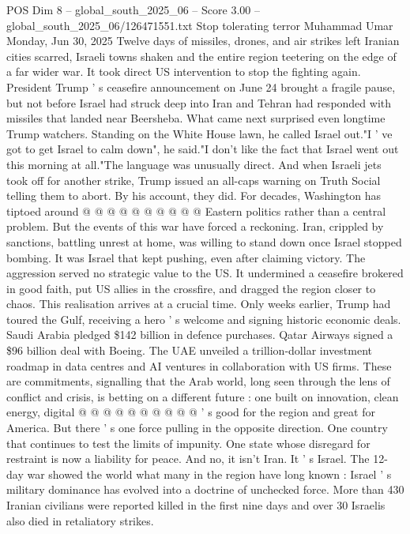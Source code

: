 \begin{textsample}{POS Dim 8 – global\_south\_2025\_06 – Score 3.00 – global\_south\_2025\_06/126471551.txt}  \label{ex:f8_pos_197}
Stop tolerating terror Muhammad Umar Monday, Jun 30, 2025 Twelve days of missiles, drones, and air strikes left Iranian cities scarred, Israeli towns shaken and the entire region teetering on the edge of a far wider war.
It took direct US intervention to stop the fighting again.
President Trump ' s ceasefire announcement on June 24 brought a fragile pause, but not before Israel had struck deep into Iran and Tehran had responded with missiles that landed near Beersheba.
What came next surprised even longtime Trump watchers.
Standing on the White House lawn, he called Israel out."I ' ve got to get Israel to calm down", he said."I don't like the fact that Israel went out this morning at all."The language was unusually direct.
And when Israeli jets took off for another strike, Trump issued an all-caps warning on Truth Social telling them to abort.
By his account, they did.
For decades, Washington has tiptoed around @ @ @ @ @ @ @ @ @ @ Eastern politics rather than a central problem.
But the events of this war have forced a reckoning.
Iran, crippled by sanctions, battling unrest at home, was willing to stand down once Israel stopped bombing.
It was Israel that kept pushing, even after claiming victory.
The aggression served no strategic value to the US.
It undermined a ceasefire brokered in good faith, put US allies in the crossfire, and dragged the region closer to chaos.
This realisation arrives at a crucial time.
Only weeks earlier, Trump had toured the Gulf, receiving a hero ' s welcome and signing historic economic deals.
Saudi Arabia pledged \$142 billion in defence purchases.
Qatar Airways signed a \$96 billion deal with Boeing.
The UAE unveiled a trillion-dollar investment roadmap in data centres and AI ventures in collaboration with US firms.
These are commitments, signalling that the Arab world, long seen through the lens of conflict and crisis, is betting on a different future : one built on innovation, clean energy, digital @ @ @ @ @ @ @ @ @ @ ' s good for the region and great for America.
But there ' s one force pulling in the opposite direction.
One country that continues to test the limits of impunity.
One state whose disregard for restraint is now a liability for peace.
And no, it isn't Iran.
It ' s Israel.
The 12-day war showed the world what many in the region have long known : Israel ' s military dominance has evolved into a doctrine of unchecked force.
More than 430 Iranian civilians were reported killed in the first nine days and over 30 Israelis also died in retaliatory strikes.

\end{textsample}
